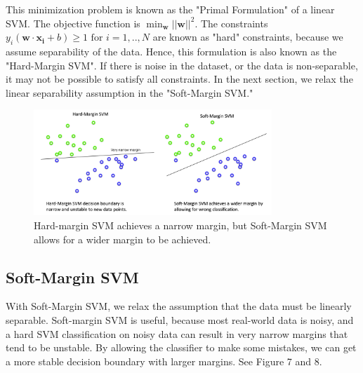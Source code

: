 \documentclass[11pt]{article}
\begin{document}
This minimization problem is known as the "Primal Formulation" of a linear SVM. The objective function is $\min_{\mathbf{w}}  ||\mathbf{w}||^2$. The constraints $y_i(\mathbf{w} \cdot \mathbf{x_{i}} +b) \geq 1 \text{ for } i = 1, .., N$ are known as "hard" constraints, because we assume separability of the data. Hence, this formulation is also known as the "Hard-Margin SVM". If there is noise in the dataset, or the data is non-separable, it may not be possible to satisfy all constraints. In the next section, we relax the linear separability assumption in the "Soft-Margin SVM."



\begin{figure}[H]
    \centering
    \includegraphics[width=0.8\textwidth]{images/hard_vs_soft.png}
    \caption{Hard-margin SVM achieves a narrow margin, but Soft-Margin SVM allows for a wider margin to be achieved.}
    \label{fig:hard_v_soft}
\end{figure}

\subsection{Soft-Margin SVM}
With Soft-Margin SVM, we relax the assumption that the data must be linearly separable. Soft-margin SVM is useful, because most real-world data is noisy, and a hard SVM classification on noisy data can result in very narrow margins that tend to be unstable. By allowing the classifier to make some mistakes, we can get a more stable decision boundary with larger margins. See Figure 7 and 8.
\end{document}
